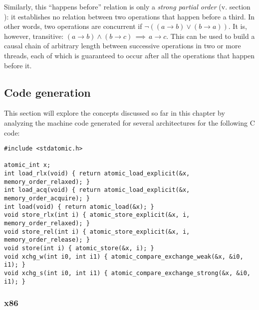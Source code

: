 Similarly, this ``happens before'' relation is only a \emph{strong partial
order} (v. section ): it establishes no relation
between two operations that happen before a third.  In other words, two
operations are concurrent if $\neg ((a \to b) \lor (b \to a))$.  It is, however,
transitive: $(a \to b) \land (b \to c) \, \implies \, a \to c$.  This can be
used to build a causal chain of arbitrary length between successive operations
in two or more threads, each of which is guaranteed to occur after all the
operations that happen before it.

\subsection{Code generation}

This section will explore the concepts discussed so far in this chapter by
analyzing the machine code generated for several architectures for the following
C code\footnotemark:


\begin{lstlisting}[style=c]
#include <stdatomic.h>

atomic_int x;
int load_rlx(void) { return atomic_load_explicit(&x, memory_order_relaxed); }
int load_acq(void) { return atomic_load_explicit(&x, memory_order_acquire); }
int load(void) { return atomic_load(&x); }
void store_rlx(int i) { atomic_store_explicit(&x, i, memory_order_relaxed); }
void store_rel(int i) { atomic_store_explicit(&x, i, memory_order_release); }
void store(int i) { atomic_store(&x, i); }
void xchg_w(int i0, int i1) { atomic_compare_exchange_weak(&x, &i0, i1); }
void xchg_s(int i0, int i1) { atomic_compare_exchange_strong(&x, &i0, i1); }
\end{lstlisting}

\subsubsection{x86}

